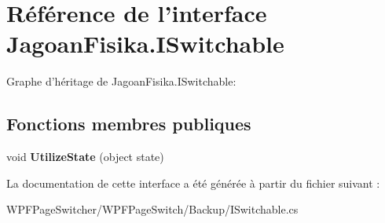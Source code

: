 \hypertarget{interface_jagoan_fisika_1_1_i_switchable}{\section{Référence de l'interface Jagoan\+Fisika.\+I\+Switchable}
\label{interface_jagoan_fisika_1_1_i_switchable}
}


Graphe d'héritage de Jagoan\+Fisika.\+I\+Switchable\+:
\subsection*{Fonctions membres publiques}
\begin{DoxyCompactItemize}
\item 
\hypertarget{interface_jagoan_fisika_1_1_i_switchable_abcbe208f948f6e86590bbd65b37b97e7}{void {\bfseries Utilize\+State} (object state)}\label{interface_jagoan_fisika_1_1_i_switchable_abcbe208f948f6e86590bbd65b37b97e7}

\end{DoxyCompactItemize}


La documentation de cette interface a été générée à partir du fichier suivant \+:\begin{DoxyCompactItemize}
\item 
W\+P\+F\+Page\+Switcher/\+W\+P\+F\+Page\+Switch/\+Backup/I\+Switchable.\+cs\end{DoxyCompactItemize}
